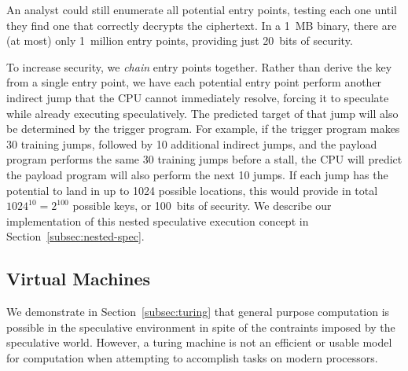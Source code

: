 An analyst could still enumerate all potential entry points, testing each one
until they find one that correctly decrypts the ciphertext. In a 1~MB binary,
there are (at most) only 1~million entry points, providing just 20~bits of
security.

To increase security, we \emph{chain} entry points together. Rather than derive
the key from a single entry point, we have each potential entry point perform
another indirect jump that the CPU cannot immediately resolve, forcing it to
speculate while already executing speculatively. The predicted target of that jump
will also be determined by the trigger program. For example, if the trigger
program makes 30 training jumps, followed by 10 additional indirect jumps, and
the payload program performs the same 30 training jumps before a stall, the CPU
will predict the payload program will also perform the next 10 jumps. If each
jump has the potential to land in up to 1024 possible locations, this would
provide in total $1024^{10} = 2^{100}$ possible keys, or 100~bits of security.
We describe our implementation of this nested speculative execution concept in
Section~\ref{subsec:nested-spec}.


%


% 
% 

\subsection{Virtual Machines}
We demonstrate in Section~\ref{subsec:turing} that general purpose computation 
is possible in the speculative environment in spite of the contraints 
imposed by the speculative world. However, a turing machine
is not an efficient or usable model for computation when
attempting to accomplish tasks on modern processors. 

